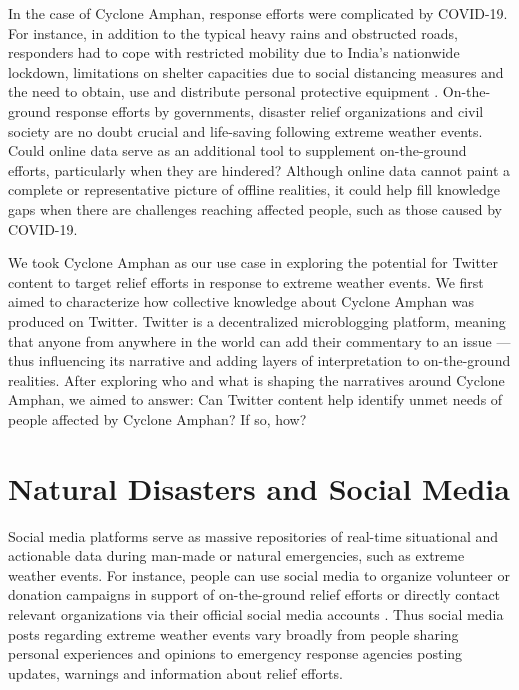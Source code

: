 \documentclass{article}
\begin{document}
In the case of Cyclone Amphan, response efforts were complicated by COVID-19. For instance, in
addition to the typical heavy rains and obstructed roads, responders had to cope with restricted
mobility due to India’s nationwide lockdown, limitations on shelter capacities due to social
distancing measures and the need to obtain, use and distribute personal protective equipment
\cite{introState,introRedcross}. On-the-ground response efforts by governments, disaster relief
organizations and civil society are no doubt crucial and life-saving following extreme weather
events. Could online data serve as an additional tool to supplement on-the-ground efforts,
particularly when they are hindered? Although online data cannot paint a complete or representative
picture of offline realities, it could help fill knowledge gaps when there are challenges reaching
affected people, such as those caused by COVID-19.

We took Cyclone Amphan as our use case in exploring the potential for Twitter content to target
relief efforts in response to extreme weather events. We first aimed to characterize how collective
knowledge about Cyclone Amphan was produced on Twitter. Twitter is a decentralized microblogging
platform, meaning that anyone from anywhere in the world can add their commentary to an issue — thus
influencing its narrative and adding layers of interpretation to on-the-ground realities. After
exploring who and what is shaping the narratives around Cyclone Amphan, we aimed to answer: Can
Twitter content help identify unmet needs of people affected by Cyclone Amphan? If so, how?

\section{Natural Disasters and Social Media}

Social media platforms serve as massive repositories of real-time situational and actionable data
during man-made or natural emergencies, such as extreme weather events. For instance, people can use
social media to organize volunteer or donation campaigns in support of on-the-ground relief efforts
or directly contact relevant organizations via their official social media accounts
\cite{Imran2015}. Thus social media posts regarding extreme weather events vary broadly from people
sharing personal experiences and opinions to emergency response agencies posting updates, warnings
and information about relief efforts.
\end{document}
